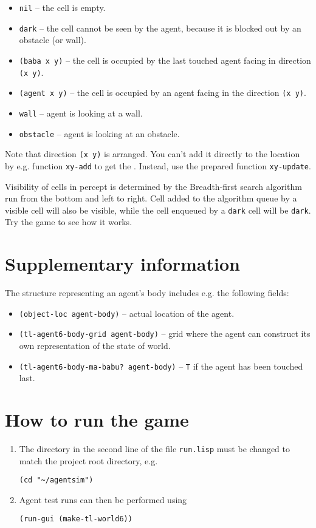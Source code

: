 \documentclass[a4paper,12pt]{article}
\begin{document}
\begin{itemize}
\item \texttt{nil} -- the cell is empty.
\item \texttt{dark} -- the cell cannot be seen by the agent, because it is blocked out by an obstacle (or wall).
\item \texttt{(baba x y)} -- the cell is occupied by the last touched agent facing in direction \texttt{(x y)}.
\item \texttt{(agent x y)} -- the cell is occupied by an agent facing in the direction \texttt{(x y)}.
\item \texttt{wall} -- agent is looking at a wall.
\item \texttt{obstacle} -- agent is looking at an obstacle.
\end{itemize}

Note that direction \texttt{(x y)} is arranged. You can't add it directly to the location by e.g. function
\texttt{xy-add} to get the . Instead, use the prepared function \texttt{xy-update}.

Visibility of cells in percept is determined by the Breadth-first search algorithm run from the bottom and left to
right. Cell added to the algorithm queue by a visible cell will also be visible, while the cell enqueued by a
\texttt{dark} cell will be \texttt{dark}. Try the game to see how it works.

\section*{Supplementary information}
The structure representing an agent's body includes e.g. the following fields:
\begin{itemize}
\item \texttt{(object-loc agent-body)} -- actual location of the agent.
\item \texttt{(tl-agent6-body-grid agent-body)} -- grid where the agent can construct its own representation of the state of
world.
\item \texttt{(tl-agent6-body-ma-babu? agent-body)} -- \texttt{T} if the agent has been touched last.
\end{itemize}

\section*{How to run the game}
\begin{enumerate}
\item The directory in the second line of the file \texttt{run.lisp} must be changed to match the project root directory, e.g.
\begin{verbatim}
(cd "~/agentsim")
\end{verbatim}

\item Agent test runs can then be performed using

\begin{verbatim}
(run-gui (make-tl-world6))
\end{verbatim}

\end{enumerate}
\end{document}
